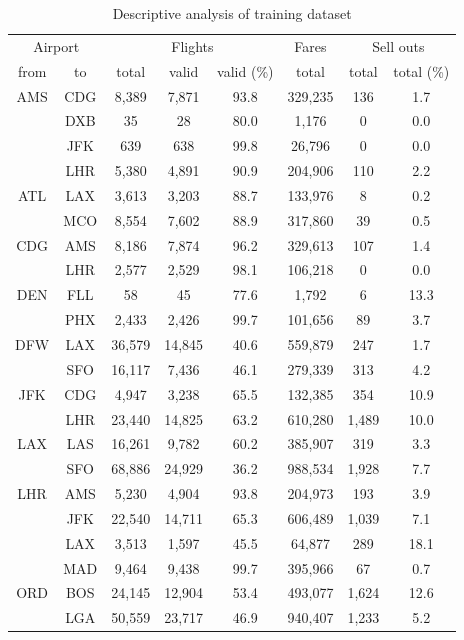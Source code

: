 \begin{table}
\centering
\footnotesize
\begin{tabular}{c c | c c c | c | c c}
\toprule
\multicolumn{2}{c|}{Airport}  & \multicolumn{3}{c|}{Flights} & Fares & \multicolumn{2}{c}{Sell outs} \\[.4ex]
from &  to  & total  & valid  & valid (\%)  &  total  &  total  &  total (\%) \\
\midrule
AMS  &  CDG  &   8,389  &   7,871  &  93.8  &  329,235  &    136  &   1.7 \\
~    &  DXB  &      35  &      28  &  80.0  &    1,176  &      0  &   0.0 \\
~    &  JFK  &     639  &     638  &  99.8  &   26,796  &      0  &   0.0 \\
~    &  LHR  &   5,380  &   4,891  &  90.9  &  204,906  &    110  &   2.2 \\[.5ex]
ATL  &  LAX  &   3,613  &   3,203  &  88.7  &  133,976  &      8  &   0.2 \\
~    &  MCO  &   8,554  &   7,602  &  88.9  &  317,860  &     39  &   0.5 \\[.5ex]
CDG  &  AMS  &   8,186  &   7,874  &  96.2  &  329,613  &    107  &   1.4 \\
~    &  LHR  &   2,577  &   2,529  &  98.1  &  106,218  &      0  &   0.0 \\[.5ex]
DEN  &  FLL  &      58  &      45  &  77.6  &    1,792  &      6  &  13.3 \\
~    &  PHX  &   2,433  &   2,426  &  99.7  &  101,656  &     89  &   3.7 \\[.5ex]
DFW  &  LAX  &  36,579  &  14,845  &  40.6  &  559,879  &    247  &   1.7 \\
~    &  SFO  &  16,117  &   7,436  &  46.1  &  279,339  &    313  &   4.2 \\[.5ex]
JFK  &  CDG  &   4,947  &   3,238  &  65.5  &  132,385  &    354  &  10.9 \\
~    &  LHR  &  23,440  &  14,825  &  63.2  &  610,280  &  1,489  &  10.0 \\[.5ex]
LAX  &  LAS  &  16,261  &   9,782  &  60.2  &  385,907  &    319  &   3.3 \\
~    &  SFO  &  68,886  &  24,929  &  36.2  &  988,534  &  1,928  &   7.7 \\[.5ex]
LHR  &  AMS  &   5,230  &   4,904  &  93.8  &  204,973  &    193  &   3.9 \\
~    &  JFK  &  22,540  &  14,711  &  65.3  &  606,489  &  1,039  &   7.1 \\
~    &  LAX  &   3,513  &   1,597  &  45.5  &   64,877  &    289  &  18.1 \\
~    &  MAD  &   9,464  &   9,438  &  99.7  &  395,966  &     67  &   0.7 \\[.5ex]
ORD  &  BOS  &  24,145  &  12,904  &  53.4  &  493,077  &  1,624  &  12.6 \\
~    &  LGA  &  50,559  &  23,717  &  46.9  &  940,407  &  1,233  &   5.2 \\
\bottomrule
\end{tabular}
\caption{Descriptive analysis of training dataset}
\label{tbl:DescriptiveAnalysisTrainingDataset}
\end{table}


